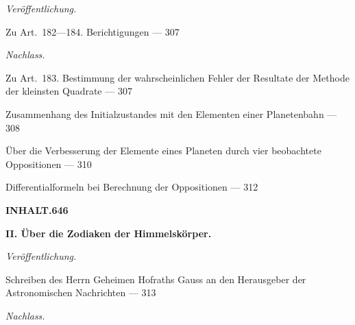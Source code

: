 \documentclass[10pt,a4paper]{article}
\newenvironment{hangparas}[2]{\setlength{\hangindent}{#1}\setlength{\hangafter}{#2}}{}
\begin{document}
\vspace{0.3em}

\noindent\textit{Veröffentlichung.}

\vspace{0.2em}

\begin{hangparas}{1em}{1}
\noindent Zu Art.~182---184. Berichtigungen \hfill --- 307
\end{hangparas}

\vspace{0.3em}

\noindent\textit{Nachlass.}

\vspace{0.2em}

\begin{hangparas}{1em}{1}
\noindent Zu Art.~183. Bestimmung der wahrscheinlichen Fehler der Resultate der Methode der kleinsten Quadrate \hfill --- 307

\noindent Zusammenhang des Initialzustandes mit den Elementen einer Planetenbahn \hfill --- 308

\noindent Über die Verbesserung der Elemente eines Planeten durch vier beobachtete Oppositionen \hfill --- 310

\noindent Differentialformeln bei Berechnung der Oppositionen \hfill --- 312
\end{hangparas}

\newpage

\begin{center}
\Large\textbf{INHALT.}\hfill\textbf{646}
\end{center}

\vspace{0.5em}

\noindent\textbf{II. Über die Zodiaken der Himmelskörper.}

\vspace{0.2em}

\noindent\textit{Veröffentlichung.}

\vspace{0.2em}

\begin{hangparas}{1em}{1}
\noindent Schreiben des Herrn Geheimen Hofraths Gauss an den Herausgeber der Astronomischen Nachrichten \hfill --- 313
\end{hangparas}

\vspace{0.2em}

\noindent\textit{Nachlass.}
\end{document}
